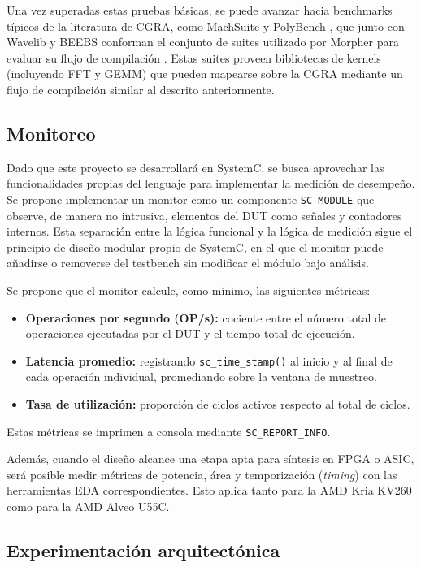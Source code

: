 \documentclass[conference]{IEEEtran}
\begin{document}
Una vez superadas estas pruebas básicas, se puede avanzar hacia benchmarks típicos de la literatura de CGRA, como MachSuite y PolyBench \cite{PolyBenchC,MachSuite}, que junto con Wavelib y BEEBS conforman el conjunto de suites utilizado por Morpher para evaluar su flujo de compilación \cite{Juneja}. Estas suites proveen bibliotecas de kernels (incluyendo FFT y GEMM) que pueden mapearse sobre la CGRA mediante un flujo de compilación similar al descrito anteriormente.


\subsection{Monitoreo}

Dado que este proyecto se desarrollará en SystemC, se busca aprovechar las funcionalidades propias del lenguaje para implementar la medición de desempeño. Se propone implementar un monitor como un componente \texttt{SC\_MODULE} que observe, de manera no intrusiva, elementos del DUT como señales y contadores internos. Esta separación entre la lógica funcional y la lógica de medición sigue el principio de diseño modular propio de SystemC, en el que el monitor puede añadirse o removerse del testbench sin modificar el módulo bajo análisis.

Se propone que el monitor calcule, como mínimo, las siguientes métricas:

\begin{itemize}
    \item \textbf{Operaciones por segundo (OP/s):} cociente entre el número total de operaciones ejecutadas por el DUT y el tiempo total de ejecución.
    \item \textbf{Latencia promedio:} registrando \texttt{sc\_time\_stamp()} al inicio y al final de cada operación individual, promediando sobre la ventana de muestreo.
    \item \textbf{Tasa de utilización:} proporción de ciclos activos respecto al total de ciclos.
\end{itemize}

Estas métricas se imprimen a consola mediante \texttt{SC\_REPORT\_INFO}.

Además, cuando el diseño alcance una etapa apta para síntesis en FPGA o ASIC, será posible medir métricas de potencia, área y temporización (\textit{timing}) con las herramientas EDA correspondientes. Esto aplica tanto para la AMD Kria KV260 como para la AMD Alveo U55C.


\subsection{Experimentación arquitectónica}
\end{document}
